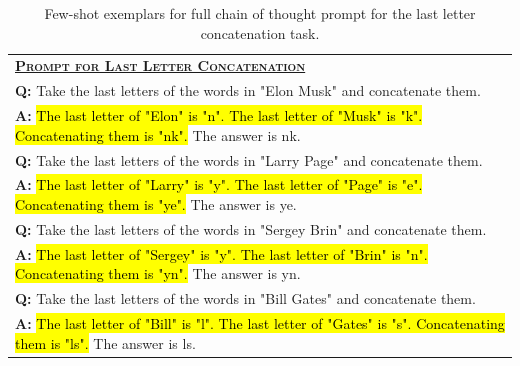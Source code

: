 \begingroup
\begin{table}[H]
    \centering
    \small
    \caption{
    Few-shot exemplars for full chain of thought prompt for the last letter concatenation task.
    }
    \begin{tabular}{p{\linewidth}}
        \toprule
        \underline{\textbf{\textsc{Prompt for Last Letter Concatenation}}} \\
        \vspace{-2mm}
        \textbf{Q:} Take the last letters of the words in "Elon Musk" and concatenate them. \\
        \vspace{-1mm}
        \textbf{A:} \hl{The last letter of "Elon" is "n". The last letter of "Musk" is "k". Concatenating them is "nk".} The answer is nk. \\
         \vspace{0mm}
        \textbf{Q:} Take the last letters of the words in "Larry Page" and concatenate them. \\
        \vspace{-1mm}
        \textbf{A:} \hl{The last letter of "Larry" is "y". The last letter of "Page" is "e". Concatenating them is "ye".} The answer is ye. \\
        \vspace{0mm}
        \textbf{Q:} Take the last letters of the words in "Sergey Brin" and concatenate them. \\
        \vspace{-1mm}
        \textbf{A:} \hl{The last letter of "Sergey" is "y". The last letter of "Brin" is "n". Concatenating them is "yn".}  The answer is yn. \\
        \vspace{0mm}
        \textbf{Q:} Take the last letters of the words in "Bill Gates" and concatenate them. \\
        \vspace{-1mm}
        \textbf{A:} \hl{The last letter of "Bill" is "l". The last letter of "Gates" is "s". Concatenating them is "ls".} The answer is ls. \\
        \bottomrule
    \end{tabular}
    \label{tab:appendix-letter-concat-prompt}
\end{table}
\endgroup